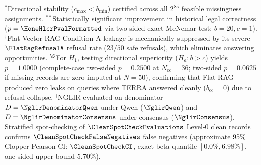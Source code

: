 \begin{table}[!t]
$^*$Directional stability ($c_{\max} < b_{\min}$) certified across all $2^{85}$ feasible missingness assignments.
$^{**}$Statistically significant improvement in historical legal correctness ($p = \HoneHlcrPvalFormatted$ via two-sided exact McNemar test; $b=20, c=1$).
$^\dagger$Flat Vector RAG Condition A leakage is mechanically suppressed by its severe $\FlatRagRefusalA$ refusal rate ($23/50$ safe refusals), which eliminates answering opportunities.
$^\S$For $H_1$, testing directional superiority ($H_a: b > c$) yields $p = 1.0000$ (complete-case two-sided $p = 0.2500$ at $N_{\text{cc}}=36$; two-sided $p = 0.0625$ if missing records are zero-imputed at $N=50$), confirming that Flat RAG produced zero leaks on queries where TERRA answered cleanly ($b_{\text{cc}}=0$) due to refusal collapse.
$^\ddagger$NGLIR evaluated on denominator $D=\NglirDenominatorQwen$ under Qwen ($\NglirQwen$) and $D=\NglirDenominatorConsensus$ under consensus ($\NglirConsensus$). Stratified spot-checking of $\CleanSpotCheckEvaluations$ Level-0 clean records confirms $\CleanSpotCheckFalseNegatives$ false negatives (approximate 95\% Clopper-Pearson CI: $\CleanSpotCheckCI$, exact beta quantile $[0.0\%, 6.98\%]$, one-sided upper bound $5.70\%$).
\end{table}
